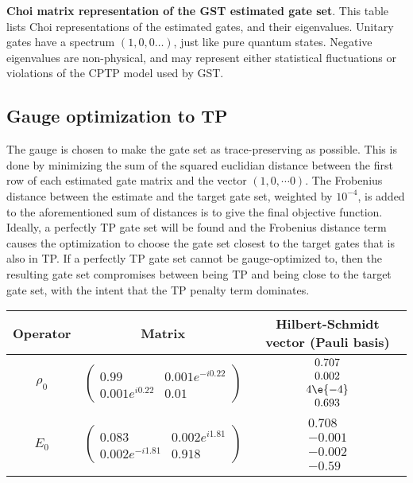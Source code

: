 {\begin{table}[h]
\begin{center}
\caption{\textbf{Choi matrix representation of the GST estimated gate set}.  This table lists Choi representations of the estimated gates, and their eigenvalues.  Unitary gates have a spectrum $(1,0,0\ldots)$, just like pure quantum states.  Negative eigenvalues are non-physical, and may represent either statistical fluctuations or violations of the CPTP model used by GST.\label{bestTargetGatesGatesetChoiTable}}
\end{center}
\end{table}

\clearpage

\subsection{Gauge optimization to TP}
The gauge is chosen to make the gate set as trace-preserving as possible.  This is done by minimizing the sum of the squared euclidian distance between the first row of each estimated gate matrix and the vector $(1,0,\cdots 0)$.  The Frobenius distance between the estimate and the target gate set, weighted by $10^{-4}$, is added to the aforementioned sum of distances is to give the final objective function.  Ideally, a perfectly TP gate set will be found and the Frobenius distance term causes the optimization to choose the gate set closest to the target gates that is also in TP.  If a perfectly TP gate set cannot be gauge-optimized to, then the resulting gate set compromises between being TP and being close to the target gate set, with the intent that the TP penalty term dominates.

\begin{table}[h]
\begin{center}
\begin{tabular}[l]{|c|c|c|}
\hline
Operator & Matrix & Hilbert-Schmidt vector (Pauli basis) \\ \hline
$\rho_{0}$ & $ \left(\!\!\begin{array}{cc}
0.99 & 0.001e^{-i0.22} \\ 
0.001e^{i0.22} & 0.01
 \end{array}\!\!\right) $
 & $ \begin{array}{c}
0.707 \\ 
0.002 \\ 
4\e{-4} \\ 
0.693
 \end{array} $
 \\ \hline
$E_{0}$ & $ \left(\!\!\begin{array}{cc}
0.083 & 0.002e^{i1.81} \\ 
0.002e^{-i1.81} & 0.918
 \end{array}\!\!\right) $
 & $ \begin{array}{c}
0.708 \\ 
-0.001 \\ 
-0.002 \\ 
-0.59
 \end{array} $
 \\ \hline
\end{tabular}


\end{center}
\end{table}}
